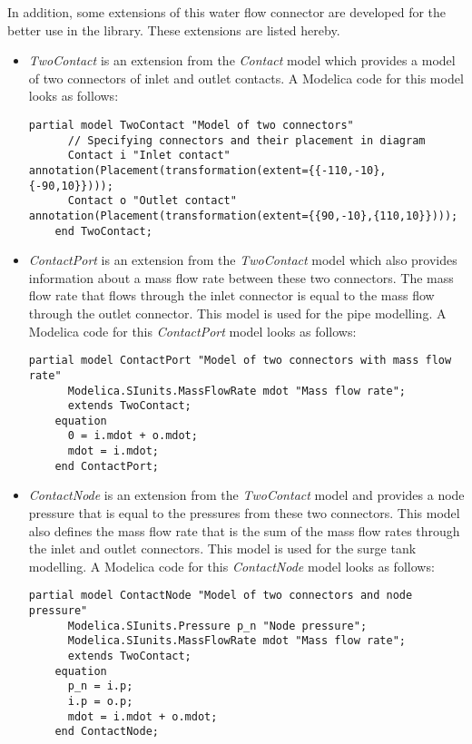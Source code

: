 \documentclass[%
]{USN-PhD}
\begin{document}
In addition, some extensions of this water flow connector are developed for the better use in the library. These extensions are listed hereby.
\begin{itemize}
    \item \emph{TwoContact} is an extension from the \emph{Contact} model which provides a model of two connectors of inlet and outlet contacts. A Modelica code for this model looks as follows:
    \begin{lstlisting}[language = modelica]
    partial model TwoContact "Model of two connectors"
      // Specifying connectors and their placement in diagram
      Contact i "Inlet contact" annotation(Placement(transformation(extent={{-110,-10},{-90,10}})));
      Contact o "Outlet contact" annotation(Placement(transformation(extent={{90,-10},{110,10}})));
    end TwoContact;
    \end{lstlisting}
    \item \emph{ContactPort} is an extension from the \emph{TwoContact} model which also provides information about a mass flow rate between these two connectors. The mass flow rate that flows through the inlet connector is equal to the mass flow through the outlet connector. This model is used for the pipe modelling. A Modelica code for this \emph{ContactPort} model looks as follows:
    \begin{lstlisting}[language = modelica]
    partial model ContactPort "Model of two connectors with mass flow rate"
      Modelica.SIunits.MassFlowRate mdot "Mass flow rate";
      extends TwoContact;
    equation
      0 = i.mdot + o.mdot;
      mdot = i.mdot;
    end ContactPort;
    \end{lstlisting}
    \item \emph{ContactNode} is an extension from the \emph{TwoContact} model and provides a node pressure that is equal to the pressures from these two connectors. This model also defines the mass flow rate that is the sum of the mass flow rates through the inlet and outlet connectors. This model is used for the surge tank modelling. A Modelica code for this \emph{ContactNode} model looks as follows:
    \begin{lstlisting}[language = modelica]
    partial model ContactNode "Model of two connectors and node pressure"
      Modelica.SIunits.Pressure p_n "Node pressure";
      Modelica.SIunits.MassFlowRate mdot "Mass flow rate";
      extends TwoContact;
    equation
      p_n = i.p;
      i.p = o.p;
      mdot = i.mdot + o.mdot;
    end ContactNode;
    \end{lstlisting}

\end{itemize}
\end{document}
